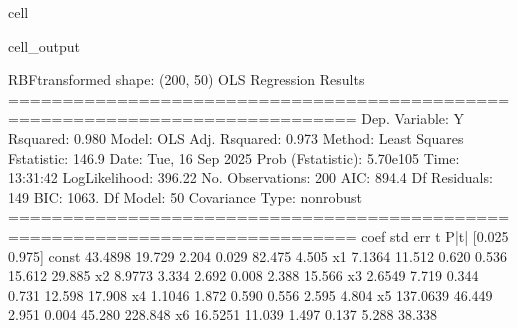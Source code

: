 \documentclass[letterpaper,10pt,english]{jupyterBook}
\begin{document}
\begin{sphinxuseclass}{cell}
\begin{sphinxVerbatimOutput}
\begin{sphinxuseclass}{cell_output}
\begin{sphinxVerbatim}[commandchars=\\\{\}]
RBF\PYGZhy{}transformed shape: (200, 50)
                            OLS Regression Results                            
==============================================================================
Dep. Variable:                      Y   R\PYGZhy{}squared:                       0.980
Model:                            OLS   Adj. R\PYGZhy{}squared:                  0.973
Method:                 Least Squares   F\PYGZhy{}statistic:                     146.9
Date:                Tue, 16 Sep 2025   Prob (F\PYGZhy{}statistic):          5.70e\PYGZhy{}105
Time:                        13:31:42   Log\PYGZhy{}Likelihood:                \PYGZhy{}396.22
No. Observations:                 200   AIC:                             894.4
Df Residuals:                     149   BIC:                             1063.
Df Model:                          50                                         
Covariance Type:            nonrobust                                         
==============================================================================
                 coef    std err          t      P\PYGZgt{}|t|      [0.025      0.975]
\PYGZhy{}\PYGZhy{}\PYGZhy{}\PYGZhy{}\PYGZhy{}\PYGZhy{}\PYGZhy{}\PYGZhy{}\PYGZhy{}\PYGZhy{}\PYGZhy{}\PYGZhy{}\PYGZhy{}\PYGZhy{}\PYGZhy{}\PYGZhy{}\PYGZhy{}\PYGZhy{}\PYGZhy{}\PYGZhy{}\PYGZhy{}\PYGZhy{}\PYGZhy{}\PYGZhy{}\PYGZhy{}\PYGZhy{}\PYGZhy{}\PYGZhy{}\PYGZhy{}\PYGZhy{}\PYGZhy{}\PYGZhy{}\PYGZhy{}\PYGZhy{}\PYGZhy{}\PYGZhy{}\PYGZhy{}\PYGZhy{}\PYGZhy{}\PYGZhy{}\PYGZhy{}\PYGZhy{}\PYGZhy{}\PYGZhy{}\PYGZhy{}\PYGZhy{}\PYGZhy{}\PYGZhy{}\PYGZhy{}\PYGZhy{}\PYGZhy{}\PYGZhy{}\PYGZhy{}\PYGZhy{}\PYGZhy{}\PYGZhy{}\PYGZhy{}\PYGZhy{}\PYGZhy{}\PYGZhy{}\PYGZhy{}\PYGZhy{}\PYGZhy{}\PYGZhy{}\PYGZhy{}\PYGZhy{}\PYGZhy{}\PYGZhy{}\PYGZhy{}\PYGZhy{}\PYGZhy{}\PYGZhy{}\PYGZhy{}\PYGZhy{}\PYGZhy{}\PYGZhy{}\PYGZhy{}\PYGZhy{}
const        \PYGZhy{}43.4898     19.729     \PYGZhy{}2.204      0.029     \PYGZhy{}82.475      \PYGZhy{}4.505
x1             7.1364     11.512      0.620      0.536     \PYGZhy{}15.612      29.885
x2             8.9773      3.334      2.692      0.008       2.388      15.566
x3             2.6549      7.719      0.344      0.731     \PYGZhy{}12.598      17.908
x4             1.1046      1.872      0.590      0.556      \PYGZhy{}2.595       4.804
x5           137.0639     46.449      2.951      0.004      45.280     228.848
x6            16.5251     11.039      1.497      0.137      \PYGZhy{}5.288      38.338

\end{sphinxVerbatim}
\end{sphinxuseclass}
\end{sphinxVerbatimOutput}
\end{sphinxuseclass}
\end{document}
